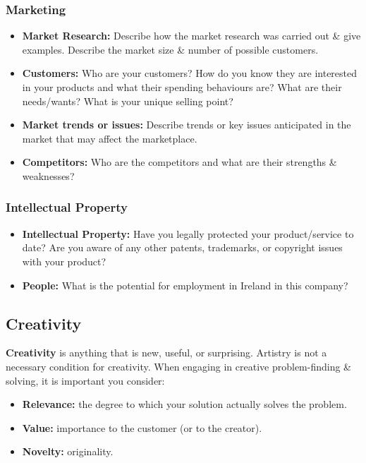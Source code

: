 \documentclass[a4paper,11pt]{article}
\begin{document}
\subsubsection{Marketing}
\begin{itemize}
    \item   \textbf{Market Research:} Describe how the market research was carried out \& give examples. 
            Describe the market size \& number of possible customers.
    \item   \textbf{Customers:} Who are your customers?
            How do you know they are interested in your products and what their spending behaviours are?
            What are their needs/wants? 
            What is your unique selling point?
    \item   \textbf{Market trends or issues:} Describe trends or key issues anticipated in the market that may affect
            the marketplace.
    \item   \textbf{Competitors:} Who are the competitors and what are their strengths \& weaknesses?
\end{itemize}

\subsubsection{Intellectual Property}
\begin{itemize}
    \item   \textbf{Intellectual Property:} Have you legally protected your product/service to date?
            Are you aware of any other patents, trademarks, or copyright issues with your product?
    \item   \textbf{People:} What is the potential for employment in Ireland in this company?
\end{itemize}

\subsection{Creativity}
\textbf{Creativity} is anything that is new, useful, or surprising.
Artistry is not a necessary condition for creativity.
When engaging in creative problem-finding \& solving, it is important you consider:
\begin{itemize}
    \item   \textbf{Relevance:} the degree to which your solution actually solves the problem.
    \item   \textbf{Value:} importance to the customer (or to the creator).
    \item   \textbf{Novelty:} originality.
\end{itemize}
\end{document}
